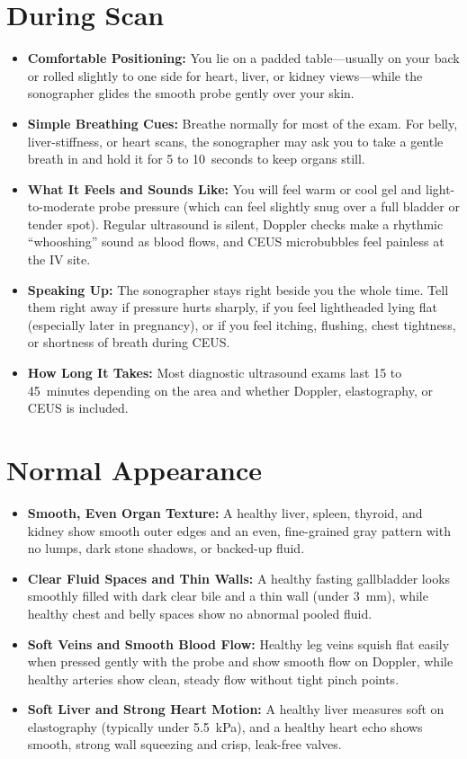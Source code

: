 \section{During Scan}
\begin{itemize}
  \item \textbf{Comfortable Positioning:} You lie on a padded table---usually on your back or rolled slightly to one side for heart, liver, or kidney views---while the sonographer glides the smooth probe gently over your skin.
  \item \textbf{Simple Breathing Cues:} Breathe normally for most of the exam. For belly, liver-stiffness, or heart scans, the sonographer may ask you to take a gentle breath in and hold it for 5 to 10~seconds to keep organs still.
  \item \textbf{What It Feels and Sounds Like:} You will feel warm or cool gel and light-to-moderate probe pressure (which can feel slightly snug over a full bladder or tender spot). Regular ultrasound is silent, Doppler checks make a rhythmic ``whooshing'' sound as blood flows, and CEUS microbubbles feel painless at the IV site.
  \item \textbf{Speaking Up:} The sonographer stays right beside you the whole time. Tell them right away if pressure hurts sharply, if you feel lightheaded lying flat (especially later in pregnancy), or if you feel itching, flushing, chest tightness, or shortness of breath during CEUS.
  \item \textbf{How Long It Takes:} Most diagnostic ultrasound exams last 15 to 45~minutes depending on the area and whether Doppler, elastography, or CEUS is included.
\end{itemize}

\section{Normal Appearance}
\begin{itemize}
  \item \textbf{Smooth, Even Organ Texture:} A healthy liver, spleen, thyroid, and kidney show smooth outer edges and an even, fine-grained gray pattern with no lumps, dark stone shadows, or backed-up fluid.
  \item \textbf{Clear Fluid Spaces and Thin Walls:} A healthy fasting gallbladder looks smoothly filled with dark clear bile and a thin wall (under 3~mm), while healthy chest and belly spaces show no abnormal pooled fluid.
  \item \textbf{Soft Veins and Smooth Blood Flow:} Healthy leg veins squish flat easily when pressed gently with the probe and show smooth flow on Doppler, while healthy arteries show clean, steady flow without tight pinch points.
  \item \textbf{Soft Liver and Strong Heart Motion:} A healthy liver measures soft on elastography (typically under 5.5~kPa), and a healthy heart echo shows smooth, strong wall squeezing and crisp, leak-free valves.
\end{itemize}

